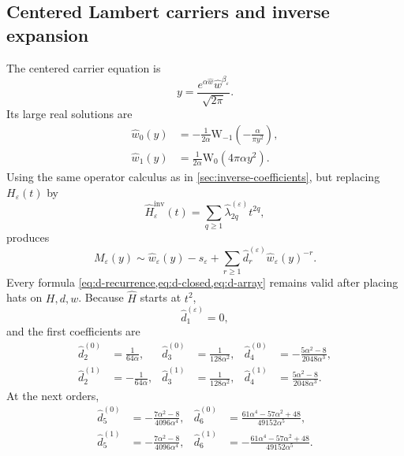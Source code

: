 \documentclass[11pt,a4paper]{article}
\theoremstyle{clean}
\theoremstyle{definition}
\newcommand{\eps}{\varepsilon}
\newcommand{\al}{\alpha}
\newcommand{\be}{\beta}
\newcommand{\W}{\mathrm W}
\begin{document}
\subsection{Centered Lambert carriers and inverse expansion}

The centered carrier equation is
\begin{equation}
 y=\frac{e^{\al\widehat w}\widehat w^{\be_\eps}}{\sqrt{2\pi}}.
 \label{eq:center-carrier-equation}
\end{equation}
Its large real solutions are
\begin{align}
 \widehat w_0(y)&=-\frac1{2\al}\W_{-1}\!\left(-\frac{\al}{\pi y^2}\right),
 \label{eq:center-w0}\\
 \widehat w_1(y)&=\frac1{2\al}\W_0\!\left(4\pi\al y^2\right).
 \label{eq:center-w1}
\end{align}
Using the same operator calculus as in \cref{sec:inverse-coefficients}, but replacing \(H_\eps(t)\) by
\begin{equation}
 \widehat H_\eps^{\mathrm{inv}}(t)
 =\sum_{q\ge1}\widehat\lambda_{2q}^{(\eps)}t^{2q},
 \label{eq:center-H-inv}
\end{equation}
produces
\begin{equation}
 \boxed{\displaystyle
 M_\eps(y)\sim\widehat w_\eps(y)-s_\eps
 +\sum_{r\ge1}\widehat d_r^{(\eps)}\widehat w_\eps(y)^{-r}.}
 \label{eq:center-inverse}
\end{equation}
Every formula \cref{eq:d-recurrence,eq:d-closed,eq:d-array} remains valid after placing hats on \(H,d,w\).  Because \(\widehat H\) starts at \(t^2\),
\begin{equation}
 \widehat d_1^{(\eps)}=0,
 \label{eq:center-d1-zero}
\end{equation}
and the first coefficients are
\begin{align}
 \widehat d_2^{(0)}&=\frac1{64\al},&
 \widehat d_3^{(0)}&=\frac1{128\al^2},&
 \widehat d_4^{(0)}&=-\frac{5\al^2-8}{2048\al^3},
 \label{eq:center-d-even-first}\\
 \widehat d_2^{(1)}&=-\frac1{64\al},&
 \widehat d_3^{(1)}&=\frac1{128\al^2},&
 \widehat d_4^{(1)}&=\frac{5\al^2-8}{2048\al^3}.
 \label{eq:center-d-odd-first}
\end{align}
At the next orders,
\begin{align}
 \widehat d_5^{(0)}&=-\frac{7\al^2-8}{4096\al^4},&
 \widehat d_6^{(0)}&=\frac{61\al^4-57\al^2+48}{49152\al^5},
 \label{eq:center-d-even-next}\\
 \widehat d_5^{(1)}&=-\frac{7\al^2-8}{4096\al^4},&
 \widehat d_6^{(1)}&=-\frac{61\al^4-57\al^2+48}{49152\al^5}.
 \label{eq:center-d-odd-next}
\end{align}
\end{document}
